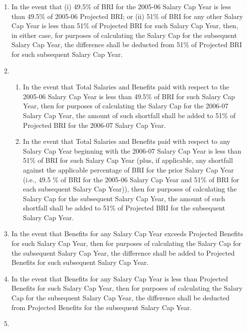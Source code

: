 \documentclass[
]{book}
\providecommand{\tightlist}{%
  \setlength{\itemsep}{0pt}\setlength{\parskip}{0pt}}
\begin{document}
\begin{enumerate}
  \begin{enumerate}
  \def\labelenumii{(\arabic{enumii})}
  \item
    In the event that (i) 49.5\% of BRI for the 2005-06 Salary Cap Year is less than 49.5\% of 2005-06 Projected BRI; or (ii) 51\% of BRI for any other Salary Cap Year is less than 51\% of Projected BRI for such Salary Cap Year, then, in either case, for purposes of calculating the Salary Cap for the subsequent Salary Cap Year, the difference shall be deducted from 51\% of Projected BRI for such subsequent Salary Cap Year.
  \item
    \begin{enumerate}
    \def\labelenumiii{(\roman{enumiii})}
    \tightlist
    \item
      In the event that Total Salaries and Benefits paid with respect to the 2005-06 Salary Cap Year is less than 49.5\% of BRI for such Salary Cap Year, then for purposes of calculating the Salary Cap for the 2006-07 Salary Cap Year, the amount of such shortfall shall be added to 51\% of Projected BRI for the 2006-07 Salary Cap Year.
    \item
      In the event that Total Salaries and Benefits paid with respect to any Salary Cap Year beginning with the 2006-07 Salary Cap Year is less than 51\% of BRI for such Salary Cap Year (plus, if applicable, any shortfall against the applicable percentage of BRI for the prior Salary Cap Year (i.e., 49.5 \% of BRI for the 2005-06 Salary Cap Year and 51\% of BRI for each subsequent Salary Cap Year)), then for purposes of calculating the Salary Cap for the subsequent Salary Cap Year, the amount of such shortfall shall be added to 51\% of Projected BRI for the subsequent Salary Cap Year.
    \end{enumerate}
  \item
    In the event that Benefits for any Salary Cap Year exceeds Projected Benefits for such Salary Cap Year, then for purposes of calculating the Salary Cap for the subsequent Salary Cap Year, the difference shall be added to Projected Benefits for such subsequent Salary Cap Year.
  \item
    In the event that Benefits for any Salary Cap Year is less than Projected Benefits for such Salary Cap Year, then for purposes of calculating the Salary Cap for the subsequent Salary Cap Year, the difference shall be deducted from Projected Benefits for the subsequent Salary Cap Year.
  \item

\end{enumerate}
\end{enumerate}
\end{document}

